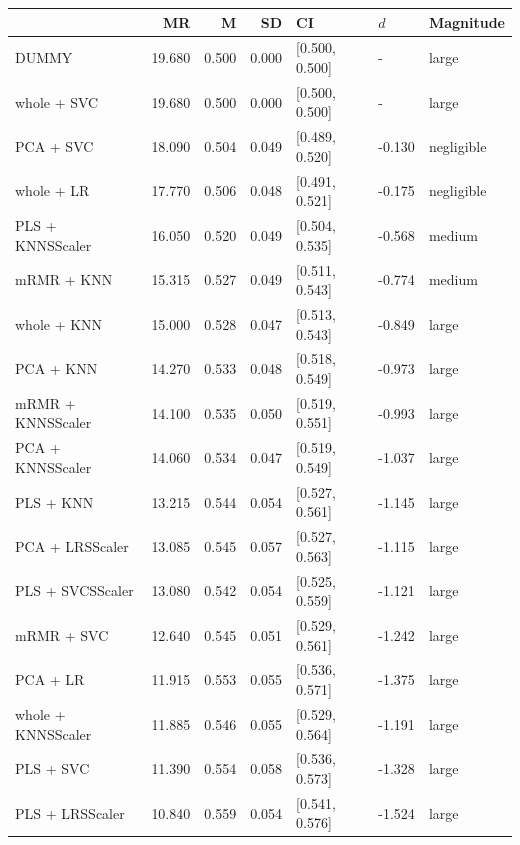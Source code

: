 \documentclass[a4paper,oneside,11pt,leqno]{article}
\begin{document}
	\begin{table}[h]
		\centering
		\begin{tabular}{lrrrlll}
			\toprule
			{} &     MR &     M &    SD &              CI &    $d$ &   Magnitude \\
			\midrule
			DUMMY              & 19.680 & 0.500 & 0.000 &  [0.500, 0.500] &      - &       large \\
			whole + SVC        & 19.680 & 0.500 & 0.000 &  [0.500, 0.500] &      - &       large \\
			PCA + SVC          & 18.090 & 0.504 & 0.049 &  [0.489, 0.520] & -0.130 &  negligible \\
			whole + LR         & 17.770 & 0.506 & 0.048 &  [0.491, 0.521] & -0.175 &  negligible \\
			PLS + KNNSScaler   & 16.050 & 0.520 & 0.049 &  [0.504, 0.535] & -0.568 &      medium \\
			mRMR + KNN         & 15.315 & 0.527 & 0.049 &  [0.511, 0.543] & -0.774 &      medium \\
			whole + KNN        & 15.000 & 0.528 & 0.047 &  [0.513, 0.543] & -0.849 &       large \\
			PCA + KNN          & 14.270 & 0.533 & 0.048 &  [0.518, 0.549] & -0.973 &       large \\
			mRMR + KNNSScaler  & 14.100 & 0.535 & 0.050 &  [0.519, 0.551] & -0.993 &       large \\
			PCA + KNNSScaler   & 14.060 & 0.534 & 0.047 &  [0.519, 0.549] & -1.037 &       large \\
			PLS + KNN          & 13.215 & 0.544 & 0.054 &  [0.527, 0.561] & -1.145 &       large \\
			PCA + LRSScaler    & 13.085 & 0.545 & 0.057 &  [0.527, 0.563] & -1.115 &       large \\
			PLS + SVCSScaler   & 13.080 & 0.542 & 0.054 &  [0.525, 0.559] & -1.121 &       large \\
			mRMR + SVC         & 12.640 & 0.545 & 0.051 &  [0.529, 0.561] & -1.242 &       large \\
			PCA + LR           & 11.915 & 0.553 & 0.055 &  [0.536, 0.571] & -1.375 &       large \\
			whole + KNNSScaler & 11.885 & 0.546 & 0.055 &  [0.529, 0.564] & -1.191 &       large \\
			PLS + SVC          & 11.390 & 0.554 & 0.058 &  [0.536, 0.573] & -1.328 &       large \\
			PLS + LRSScaler    & 10.840 & 0.559 & 0.054 &  [0.541, 0.576] & -1.524 &       large \\

\end{tabular}
\end{table}
\end{document}
